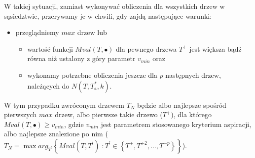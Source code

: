 W takiej sytuacji, zamiast wykonywać obliczenia dla wszystkich drzew w sąsiedztwie, przerywamy je w chwili, gdy zajdą następujące warunki:

\begin{itemize}
	\item przeglądniemy $max$ drzew lub
	\begin{itemize}
		\item wartość funkcji $Mval \left( T, \bullet \right)$ dla pewnego drzewa $T^{+}$ jest większa bądź równa niż ustalony z góry parametr $v_{min}$ oraz
		\item wykonamy potrzebne obliczenia jeszcze dla $p$ następnych drzew, należących do $N \left( T, T^{\ast}_{\textbf{s}}, k \right)$.
	\end{itemize}
\end{itemize}

W tym przypadku zwróconym drzewem $T_{N}$ będzie albo najlepsze spośród pierwszych $max$ drzew, albo pierwsze takie drzewo ($T^{+}$), dla którego $Mval \left( T, \bullet \right) \geqslant v_{min}$, gdzie $v_{min}$ jest parametrem stosowanego kryterium aspiracji, albo najlepsze znalezione po nim ($T_{N} = \max arg_{T^{\prime}} \left\{ Mval \left( T, T^{\prime} \right) \; : T^{\prime} \in \left\{ T^{+}, T^{+2}, \dots, T^{+p} \right\} \right\}$).


